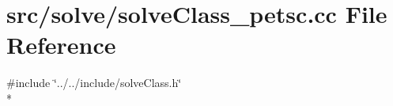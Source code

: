 \section{src/solve/solve\-Class\-\_\-petsc.cc File Reference}
\label{solve_class__petsc_8cc}
{\ttfamily \#include \char`\"{}../../include/solve\-Class.\-h\char`\"{}}\\*
